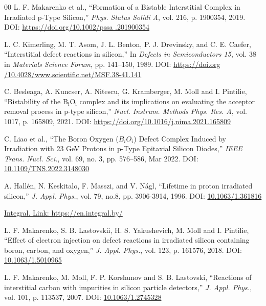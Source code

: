 \documentclass[final, 5p, times]{elsarticle}
\begin{document}
\begin{thebibliography}{00}
 L. F. Makarenko et al., ``Formation of a Bistable Interstitial
Complex in Irradiated p-Type Silicon,'' \textit{Phys. Status Solidi A}, vol.
216, p. 1900354, 2019. 
DOI:
\href{https://doi.org/10.1002/pssa.201900354}{https://doi.org/10.1002/pssa
.201900354}

 L. C. Kimerling, M. T. Asom,  J. L. Benton, P. J. Drevinsky, and
C. E. Caefer, ``Interstitial defect reactions in silicon,'' In \textit{Defects
in Semiconductors 15}, vol. 38 in \textit{Materials Science Forum}, pp.
141--150, 1989.
DOI:
\href{https://doi.org/10.4028/www.scientific.net/MSF.38-41.141}{https://doi.org
/10.4028/www.scientific.net/MSF.38-41.141}

 C. Besleaga, A. Kuncser, A. Nitescu, G. Kramberger, M. Moll and
I. Pintilie, ``Bistability of the B$_\text{i}$O$_\text{i}$ complex and its implications on
evaluating the acceptor removal process in p-type silicon,'' \textit{Nucl.
Instrum. Methods Phys. Res. A}, vol. 1017, p. 165809, 2021.
DOI:
\href{https://www.sciencedirect.com/science/article/pii/S0168900221007944}
{https://doi.org/10.1016/j.nima.2021.165809}

 C. Liao et al., ``The Boron Oxygen ($\si{B_i O_i}$) Defect
Complex Induced by Irradiation with 23 GeV Protons in p-Type Epitaxial Silicon
Diodes,'' \textit{IEEE Trans. Nucl. Sci.}, vol. 69, no. 3, pp. 576--586, Mar
2022. 
DOI:
\href{https://ieeexplore.ieee.org/document/9698047}{10.1109/TNS.2022.3148030}

 A. Hall\'en, N. Keskitalo, F. Masszi, and V. N\'agl, ``Lifetime in proton irradiated silicon,'' \textit{J. Appl. Phys.}, vol. 79, no.8, pp. 3906-3914, 1996.
DOI: \href{https://aip.scitation.org/doi/abs/10.1063/1.361816}{10.1063/1.361816}



 \href{https://en.integral.by/}{Integral. Link: https://en.integral.by/}

 L. F. Makarenko, S. B. Lastovskii, H. S. Yakushevich, M. Moll and
I. Pintilie, ``Effect of electron injection on defect reactions in irradiated
silicon containing boron, carbon, and oxygen,'' \textit{J. Appl. Phys.}, vol.
123, p. 161576, 2018. 
DOI: \href{https://doi.org/10.1063/1.5010965}{10.1063/1.5010965}


 L. F. Makarenko, M. Moll, F. P. Korshunov and S. B. Lastovski,
``Reactions of interstitial carbon with impurities in silicon particle
detectors,'' \textit{J. Appl. Phys.}, vol. 101, p. 113537, 2007. 
DOI: \href{https://doi.org/10.1063/1.2745328}{10.1063/1.2745328}


\end{thebibliography}
\end{document}
